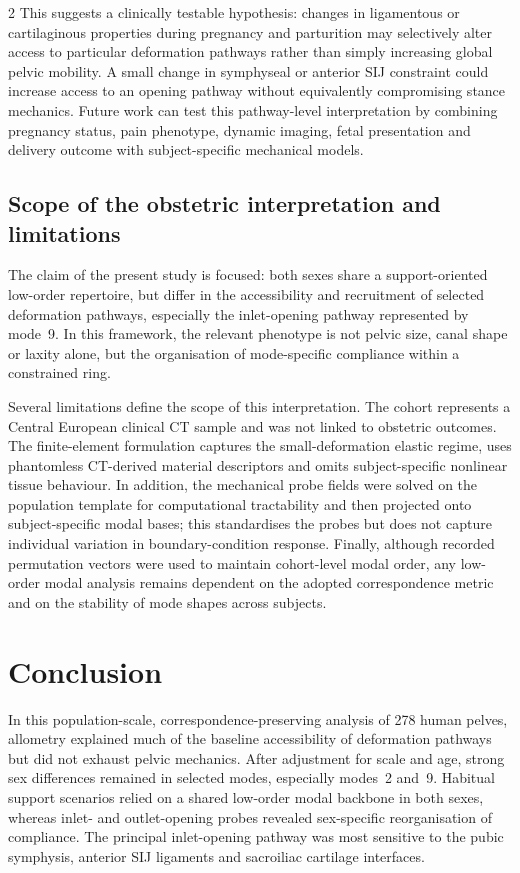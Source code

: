 \documentclass[openacc]{rsproca_new}
\begin{document}
\begin{multicols}{2}
This suggests a clinically testable hypothesis: changes in ligamentous or cartilaginous properties during pregnancy and parturition may selectively alter access to particular deformation pathways rather than simply increasing global pelvic mobility. A small change in symphyseal or anterior SIJ constraint could increase access to an opening pathway without equivalently compromising stance mechanics. Future work can test this pathway-level interpretation by combining pregnancy status, pain phenotype, dynamic imaging, fetal presentation and delivery outcome with subject-specific mechanical models.

\subsection{Scope of the obstetric interpretation and limitations}

The claim of the present study is focused: both sexes share a support-oriented low-order repertoire, but differ in the accessibility and recruitment of selected deformation pathways, especially the inlet-opening pathway represented by mode~9. In this framework, the relevant phenotype is not pelvic size, canal shape or laxity alone, but the organisation of mode-specific compliance within a constrained ring.

Several limitations define the scope of this interpretation. The cohort represents a Central European clinical CT sample and was not linked to obstetric outcomes. The finite-element formulation captures the small-deformation elastic regime, uses phantomless CT-derived material descriptors and omits subject-specific nonlinear tissue behaviour. In addition, the mechanical probe fields were solved on the population template for computational tractability and then projected onto subject-specific modal bases; this standardises the probes but does not capture individual variation in boundary-condition response. Finally, although recorded permutation vectors were used to maintain cohort-level modal order, any low-order modal analysis remains dependent on the adopted correspondence metric and on the stability of mode shapes across subjects.

\section{Conclusion}

In this population-scale, correspondence-preserving analysis of 278 human pelves, allometry explained much of the baseline accessibility of deformation pathways but did not exhaust pelvic mechanics. After adjustment for scale and age, strong sex differences remained in selected modes, especially modes~2 and~9. Habitual support scenarios relied on a shared low-order modal backbone in both sexes, whereas inlet- and outlet-opening probes revealed sex-specific reorganisation of compliance. The principal inlet-opening pathway was most sensitive to the pubic symphysis, anterior SIJ ligaments and sacroiliac cartilage interfaces.


\end{multicols}
\end{document}

